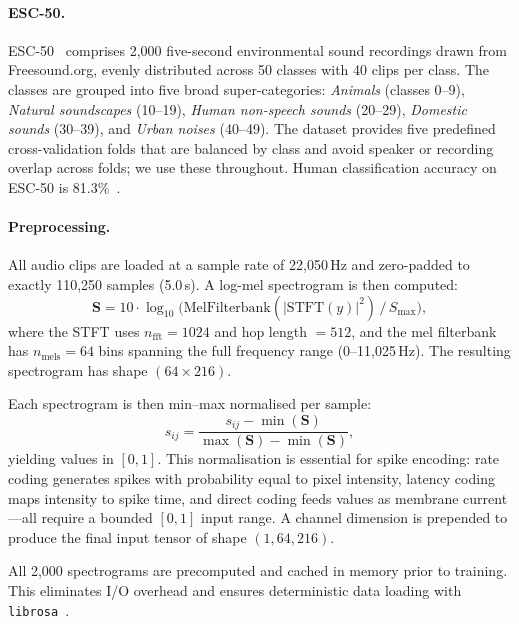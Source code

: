 \paragraph{ESC-50.}
ESC-50~\citep{piczak2015esc} comprises 2,000 five-second environmental sound recordings drawn from Freesound.org, evenly distributed across 50 classes with 40 clips per class. The classes are grouped into five broad super-categories: \emph{Animals} (classes 0--9), \emph{Natural soundscapes} (10--19), \emph{Human non-speech sounds} (20--29), \emph{Domestic sounds} (30--39), and \emph{Urban noises} (40--49). The dataset provides five predefined cross-validation folds that are balanced by class and avoid speaker or recording overlap across folds; we use these throughout. Human classification accuracy on ESC-50 is 81.3\%~\citep{piczak2015esc}.

\paragraph{Preprocessing.}
All audio clips are loaded at a sample rate of 22,050\,Hz and zero-padded to exactly 110,250 samples (5.0\,s). A log-mel spectrogram is then computed:
\begin{equation}
\label{eq:mel}
\mathbf{S} = 10 \cdot \log_{10}\!\bigl(\text{MelFilterbank}(|\text{STFT}(y)|^2) \,/\, S_{\max}\bigr),
\end{equation}
where the STFT uses $n_\text{fft} = 1024$ and hop length $= 512$, and the mel filterbank has $n_\text{mels} = 64$ bins spanning the full frequency range (0--11,025\,Hz). The resulting spectrogram has shape $(64 \times 216)$.

Each spectrogram is then min--max normalised per sample:
\begin{equation}
\label{eq:norm}
\hat{s}_{ij} = \frac{s_{ij} - \min(\mathbf{S})}{\max(\mathbf{S}) - \min(\mathbf{S})},
\end{equation}
yielding values in $[0, 1]$. This normalisation is essential for spike encoding: rate coding generates spikes with probability equal to pixel intensity, latency coding maps intensity to spike time, and direct coding feeds values as membrane current---all require a bounded $[0, 1]$ input range. A channel dimension is prepended to produce the final input tensor of shape $(1, 64, 216)$.

All 2,000 spectrograms are precomputed and cached in memory prior to training. This eliminates I/O overhead and ensures deterministic data loading with \texttt{librosa}~\citep{mcfee2015librosa}.

